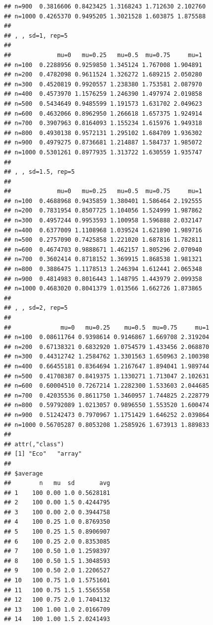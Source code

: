 \documentclass[11pt,a4paper]{article}
\begin{document}
\begin{verbatim}
## n=900  0.3816606 0.8423425 1.3168243 1.712630 2.102760
## n=1000 0.4265370 0.9495205 1.3021528 1.603875 1.875588
## 
## , , sd=1, rep=5
## 
##             mu=0   mu=0.25   mu=0.5  mu=0.75     mu=1
## n=100  0.2288956 0.9259850 1.345124 1.767008 1.904891
## n=200  0.4782098 0.9611524 1.326272 1.689215 2.050280
## n=300  0.4520819 0.9920557 1.238380 1.753581 2.087970
## n=400  0.4573970 1.1576259 1.246390 1.497974 2.019858
## n=500  0.5434649 0.9485599 1.191573 1.631702 2.049623
## n=600  0.4632066 0.8962950 1.266618 1.657375 1.924914
## n=700  0.3907963 0.8164093 1.155234 1.615976 1.949318
## n=800  0.4930138 0.9572131 1.295102 1.684709 1.936302
## n=900  0.4979275 0.8736681 1.214887 1.584737 1.985072
## n=1000 0.5301261 0.8977935 1.313722 1.630559 1.935747
## 
## , , sd=1.5, rep=5
## 
##             mu=0   mu=0.25   mu=0.5  mu=0.75     mu=1
## n=100  0.4688968 0.9435859 1.380401 1.586464 2.192555
## n=200  0.7831954 0.8507725 1.104056 1.524999 1.987862
## n=300  0.4957244 0.9953593 1.100958 1.596888 2.032147
## n=400  0.6377009 1.1108968 1.039524 1.621890 1.989716
## n=500  0.2757090 0.7425858 1.221020 1.687816 1.782811
## n=600  0.4674703 0.9888671 1.462157 1.805296 2.070940
## n=700  0.3602414 0.8718152 1.369915 1.868538 1.981321
## n=800  0.3886475 1.1178513 1.246394 1.612441 2.065348
## n=900  0.4814983 0.8016443 1.148795 1.443979 2.099358
## n=1000 0.4683020 0.8041379 1.013566 1.662726 1.873865
## 
## , , sd=2, rep=5
## 
##              mu=0   mu=0.25    mu=0.5  mu=0.75     mu=1
## n=100  0.08611764 0.9398614 0.9146867 1.669708 2.319204
## n=200  0.67138321 0.6832920 1.0754579 1.433456 2.068870
## n=300  0.44312742 1.2584762 1.3301563 1.650963 2.100398
## n=400  0.66455181 0.8364694 1.2167647 1.894041 1.989744
## n=500  0.41708387 0.8419375 1.1330271 1.713047 2.102631
## n=600  0.60004510 0.7267214 1.2282300 1.533603 2.044685
## n=700  0.42035536 0.8611750 1.3460957 1.744825 2.228779
## n=800  0.59792089 1.0213057 0.9896550 1.553520 1.600474
## n=900  0.51242473 0.7970967 1.1751429 1.646252 2.039864
## n=1000 0.56705287 0.8053208 1.2585926 1.673913 1.889833
## 
## attr(,"class")
## [1] "Eco"   "array"
## 
## $average
##        n   mu  sd       avg
## 1    100 0.00 1.0 0.5628181
## 2    100 0.00 1.5 0.4244795
## 3    100 0.00 2.0 0.3944758
## 4    100 0.25 1.0 0.8769350
## 5    100 0.25 1.5 0.8906907
## 6    100 0.25 2.0 0.8353085
## 7    100 0.50 1.0 1.2598397
## 8    100 0.50 1.5 1.3048593
## 9    100 0.50 2.0 1.2206527
## 10   100 0.75 1.0 1.5751601
## 11   100 0.75 1.5 1.5565558
## 12   100 0.75 2.0 1.7404132
## 13   100 1.00 1.0 2.0166709
## 14   100 1.00 1.5 2.0241493

\end{verbatim}
\end{document}
